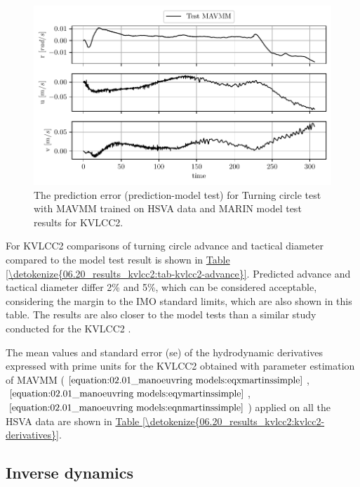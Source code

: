 \begin{figure}[!htb]
\centering
\includegraphics{kappa/images/18.pdf}
\caption{The prediction error (prediction-model test) for Turning circle test with MAVMM trained on HSVA data and MARIN model test results for KVLCC2.}\label{\detokenize{06.20_results_kvlcc2:fig-kvlcc2-testing-sim-error}}\end{figure}


For KVLCC2 comparisons of turning circle advance and tactical diameter compared to the model test result is shown in \hyperref[\detokenize{06.20_results_kvlcc2:tab-kvlcc2-advance}]{Table \ref{\detokenize{06.20_results_kvlcc2:tab-kvlcc2-advance}}}. Predicted advance and tactical diameter differ 2\% and 5\%, which can be considered acceptable, considering the margin to the IMO standard limits, which are also shown in this table. The results are also closer to the model tests than a similar study conducted for the KVLCC2 \cite{he_nonparametric_2022}.





The mean values and standard error (se) of the hydrodynamic derivatives expressed with prime units for the KVLCC2 obtained with parameter estimation of MAVMM (\(\autoref{equation:02.01_manoeuvring models:eqxmartinssimple}\), \(\autoref{equation:02.01_manoeuvring models:eqymartinssimple}\), \(\autoref{equation:02.01_manoeuvring models:eqnmartinssimple}\)) applied on all the HSVA data are shown in \hyperref[\detokenize{06.20_results_kvlcc2:kvlcc2-derivatives}]{Table \ref{\detokenize{06.20_results_kvlcc2:kvlcc2-derivatives}}}.


\subsection{Inverse dynamics}
\label{\detokenize{06.40_results_inverse_dynamics:inverse-dynamics}}\label{\detokenize{06.40_results_inverse_dynamics::doc}}

